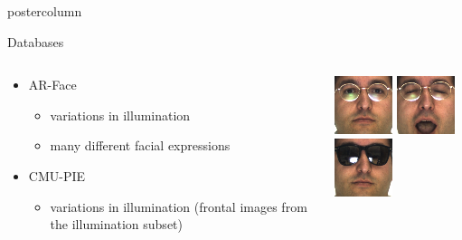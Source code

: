 \documentclass[final,hyperref={pdfpagelabels=false}]{beamer}
\begin{document}
\begin{frame}
\begin{columns}
\begin{column}{.49\textwidth}
\begin{beamercolorbox}[center,wd=\textwidth]{postercolumn}
\begin{minipage}[T]{.95\textwidth}
{            \begin{block}{Databases}
              \begin{columns}
                \begin{column}{.6\textwidth}
                  \begin{itemize}
                  \item AR-Face
                    \begin{itemize}
                    \item variations in illumination
                    \item many different facial expressions
                    \end{itemize}
                  \item CMU-PIE
                    \begin{itemize}
                    \item variations in illumination (frontal images from the illumination subset)
                    \end{itemize}
                  \end{itemize}
                \end{column}
                \begin{column}{.39\textwidth}
                  \includegraphics[width=0.22\linewidth]{hanselmann-databases/arface/train/png/occlusions/arneutral/m-016-1}
                  \-
                  \includegraphics[width=0.22\linewidth]{hanselmann-databases/arface/train/png/cropped/m-016-4}
                  \-
                  \includegraphics[width=0.22\linewidth]{hanselmann-databases/arface/test/png/occlusions/ar1sun/m-016-8}

\end{column}
\end{columns}
\end{block}}
\end{minipage}
\end{beamercolorbox}
\end{column}
\end{columns}
\end{frame}
\end{document}
